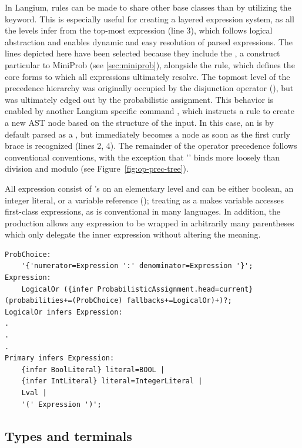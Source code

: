 In Langium, rules can be made to share other base classes than  by utilizing the  keyword. This is especially useful for creating a layered expression system, as all the levels infer from the top-most expression (line 3), which follows logical abstraction and enables dynamic and easy resolution of parsed expressions.
The lines depicted here have been selected because they include the , a construct particular to MiniProb (see \ref{sec:miniprob}), alongside the  rule, which defines the core forms to which all expressions ultimately resolve.
The topmost level of the precedence hierarchy was originally occupied by the disjunction operator (\code{||}), but was ultimately edged out by the probabilistic assignment. This behavior is enabled by another Langium specific command , which instructs a rule to create a new AST node based on the structure of the input.
In this case, an  is by default parsed as a , but immediately becomes a  node as soon as the first curly brace is recognized (lines 2, 4). The remainder of the operator precedence follows conventional conventions, with the exception that '\code{*}' binds more loosely than division and modulo (see Figure~\ref{fig:op-prec-tree}).

All expression consist of 's on an elementary level and can be either boolean, an integer literal, or a variable reference (); treating  as a  makes variable accesses first-class expressions,
as is conventional in many languages. In addition, the production allows any expression to be wrapped in arbitrarily many parentheses which only delegate the inner expression without altering the meaning.

\begin{verbatim}
ProbChoice:
    '{'numerator=Expression ':' denominator=Expression '}';
Expression:
    LogicalOr ({infer ProbabilisticAssignment.head=current} (probabilities+=(ProbChoice) fallbacks+=LogicalOr)+)?;
LogicalOr infers Expression:
.
.
.
Primary infers Expression:
    {infer BoolLiteral} literal=BOOL | 
    {infer IntLiteral} literal=IntegerLiteral |
    Lval |
    '(' Expression ')';
\end{verbatim}

\subsection*{Types and terminals}

